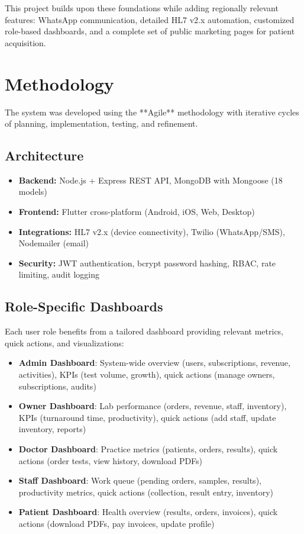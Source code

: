 \documentclass[12pt, a4paper]{report}
\begin{document}
This project builds upon these foundations while adding regionally relevant features: WhatsApp communication, detailed HL7 v2.x automation, customized role-based dashboards, and a complete set of public marketing pages for patient acquisition.

\chapter{Methodology}
The system was developed using the **Agile** methodology with iterative cycles of planning, implementation, testing, and refinement.

\section{Architecture}
\begin{itemize}
    \item \textbf{Backend:} Node.js + Express REST API, MongoDB with Mongoose (18 models)
    \item \textbf{Frontend:} Flutter cross-platform (Android, iOS, Web, Desktop)
    \item \textbf{Integrations:} HL7 v2.x (device connectivity), Twilio (WhatsApp/SMS), Nodemailer (email)
    \item \textbf{Security:} JWT authentication, bcrypt password hashing, RBAC, rate limiting, audit logging
\end{itemize}

\section{Role-Specific Dashboards}
Each user role benefits from a tailored dashboard providing relevant metrics, quick actions, and visualizations:
\begin{itemize}
    \item \textbf{Admin Dashboard}: System-wide overview (users, subscriptions, revenue, activities), KPIs (test volume, growth), quick actions (manage owners, subscriptions, audits)
    \item \textbf{Owner Dashboard}: Lab performance (orders, revenue, staff, inventory), KPIs (turnaround time, productivity), quick actions (add staff, update inventory, reports)
    \item \textbf{Doctor Dashboard}: Practice metrics (patients, orders, results), quick actions (order tests, view history, download PDFs)
    \item \textbf{Staff Dashboard}: Work queue (pending orders, samples, results), productivity metrics, quick actions (collection, result entry, inventory)
    \item \textbf{Patient Dashboard}: Health overview (results, orders, invoices), quick actions (download PDFs, pay invoices, update profile)
\end{itemize}
\end{document}
